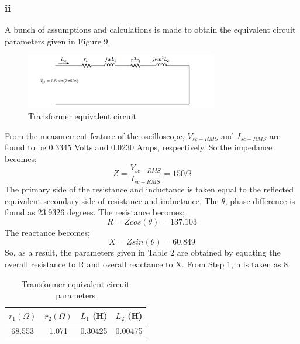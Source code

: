 \documentclass[letterpaper,12pt]{article}
\begin{document}
\subsubsection{ii}
A bunch of assumptions and calculations is made to obtain the equivalent circuit parameters given in Figure 9.
\begin{figure}[H]
    \centering
    \includegraphics[width = 0.75\textwidth]{3.png}
    \caption{Transformer equivalent circuit}
\end{figure} 
From the measurement feature of the oscilloscope, \(V_{sc-RMS}\) and \(I_{sc-RMS}\) are found to be 0.3345 Volts and 0.0230 Amps, respectively. So the impedance becomes;
\[
    Z = \frac{V_{sc-RMS}}{I_{sc-RMS}} = 150 \Omega
    \]
    The primary side of the resistance and inductance is taken equal to the reflected equivalent secondary side of resistance and inductance. The \(\theta\), phase difference is found as 23.9326 degrees. The resistance becomes;
    \[
    R = Z cos (\theta) = 137.103
    \]
    The reactance becomes;
    \[
    X = Z sin (\theta) = 60.849 
    \]
    So, as a result, the parameters given in Table 2 are obtained by equating the overall resistance to R and overall reactance to X. From Step 1, n is taken as 8.
    \begin{table}[H]
    \begin{center}
        \caption{Transformer equivalent circuit parameters}
        \vspace{2mm}
        \begin{tabular}{||c | c | c | c ||} 
            \hline
            \(r_1 (\Omega) \) & \(r_2 (\Omega)\)  & \(L_1\) (H) & \(L_2\) (H) \\ [0.5ex] 
            \hline\hline
            68.553 & 1.071 & 0.30425 & 0.00475 \\ 
            \hline
        \end{tabular}
    \end{center}
    \end{table}
    

\end{document}
